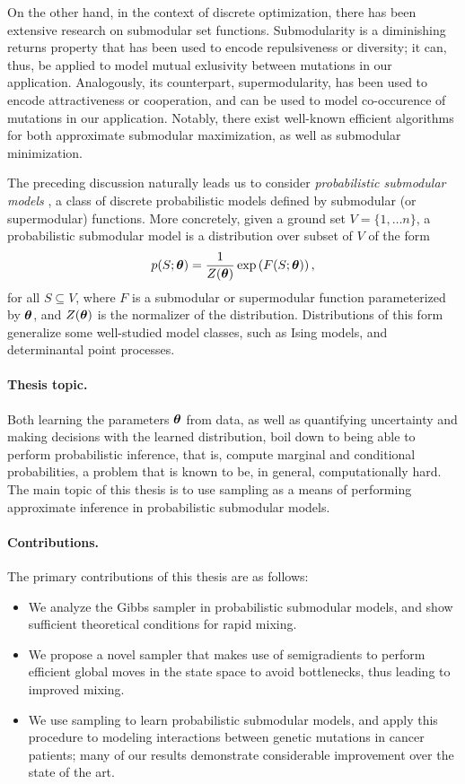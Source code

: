On the other hand, in the context of discrete optimization, there has been extensive research on submodular set functions.
Submodularity is a diminishing returns property that has been used to encode repulsiveness or diversity; it can, thus, be applied to model mutual exlusivity between mutations in our application.
Analogously, its counterpart, supermodularity, has been used to encode attractiveness or cooperation, and can be used to model co-occurence of mutations in our application.
Notably, there exist well-known efficient algorithms for both approximate submodular maximization, as well as submodular minimization.

The preceding discussion naturally leads us to consider \emph{probabilistic submodular models} \citep{djolonga14,gotovos15}, a class of discrete probabilistic models defined by submodular (or supermodular) functions.
More concretely, given a ground set $V = \{1,\ldots n\}$, a probabilistic submodular model is a distribution over subset of $V$ of the form
\begin{align*}
p(S; \bm{\theta}) = \frac{1}{Z(\bm{\theta})} \exp\left( F(S; \bm{\theta}) \right),
\end{align*}
for all $S \subseteq V$, where $F$ is a submodular or supermodular function parameterized by $\bm{\theta}$, and $Z(\bm{\theta})$ is the normalizer of the distribution.
Distributions of this form generalize some well-studied model classes, such as Ising models, and determinantal point processes.

\paragraph{Thesis topic.} Both learning the parameters $\bm{\theta}$ from data, as well as quantifying uncertainty and making decisions with the learned distribution, boil down to being able to perform probabilistic inference, that is, compute marginal and conditional probabilities, a problem that is known to be, in general, computationally hard.
The main topic of this thesis is to use sampling as a means of performing approximate inference in probabilistic submodular models.

\paragraph{Contributions.} The primary contributions of this thesis are as follows:
\begin{itemize}
\item We analyze the Gibbs sampler in probabilistic submodular models, and show sufficient theoretical conditions for rapid mixing.
\item We propose a novel sampler that makes use of semigradients to perform efficient global moves in the state space to avoid bottlenecks, thus leading to improved mixing.
\item We use sampling to learn probabilistic submodular models, and apply this procedure to modeling interactions between genetic mutations in cancer patients; many of our results demonstrate considerable improvement over the state of the art.
\end{itemize}

